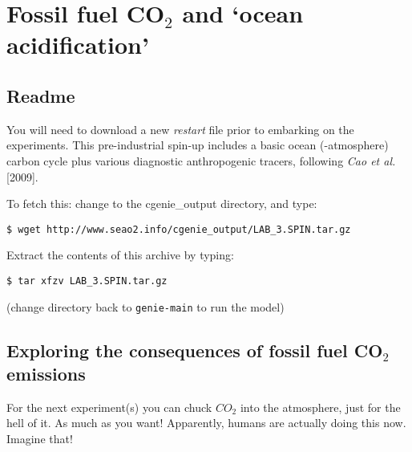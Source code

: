 \documentclass[11pt,fleqn]{book} %
\begin{document}
\chapter{Fossil fuel CO$_{2}$ and ‘ocean acidification’}

\hfill \break


\newpage


\section*{Readme}

You will need to download a new \textit{restart} file prior to embarking on the experiments. This pre-industrial spin-up includes a basic ocean (-atmosphere) carbon cycle plus various diagnostic anthropogenic tracers, following \textit{Cao et al.} [2009].

\noindent To fetch this: change to the cgenie\_output directory, and type:
\vspace{-2mm}
\begin{verbatim}
$ wget http://www.seao2.info/cgenie_output/LAB_3.SPIN.tar.gz
\end{verbatim}
\vspace{-2mm}

\noindent Extract the contents of this archive by typing:
\vspace{-2mm}
\begin{verbatim}
$ tar xfzv LAB_3.SPIN.tar.gz
\end{verbatim}
\vspace{-2mm}
\noindent (change directory back to \texttt{genie-main} to run the model)


\newpage


\section{Exploring the consequences of fossil fuel CO$_{2}$ emissions}

For the next experiment(s) you can chuck \(CO_{2}\) into the atmosphere, just for the hell of it. As much as you want! Apparently, humans are actually doing this now. Imagine that!
\end{document}
